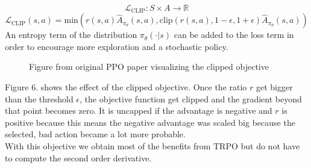 \documentclass{article}
\begin{document}
\begin{equation}
    {\mathcal L}_{\mathrm{CLIP}}: S\times A \xrightarrow{} \mathbb{R}
\end{equation}
\begin{equation*}
    {\mathcal L}_{\mathrm{CLIP}}(s, a) = \mathrm{min}(r(s,a) \hat{A}_{\pi_\theta}(s,a), \mathrm{clip}(r(s,a), 1 - \epsilon, 1 + \epsilon)\hat{A}_{\pi_\theta}(s,a))
\end{equation*}
\noindent An entropy term of the distribution $\pi_\theta(\cdot|s)$ can be added
to the loss term in order to encourage more exploration and a stochastic policy.

\begin{figure}[h]
    \centering
    \qquad
    \caption{Figure from original PPO paper visualizing the clipped objective~\cite{DBLP:journals/corr/SchulmanWDRK17}}
\end{figure}

\noindent Figure 6. shows the effect of the clipped objective. Once the ratio
$r$ get bigger than the threshold $\epsilon$, the objective function get clipped and the gradient
beyond that point becomes zero. It is uncapped if the advantage is negative
and $r$ is positive because this means the negative advantage was scaled big because 
the selected, bad action became a lot more probable.\\
With this objective we obtain most of the benefits from TRPO but do not have
to compute the second order derivative.
\end{document}
